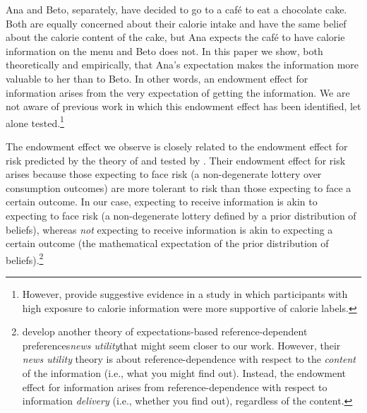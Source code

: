 
Ana and Beto, separately, have decided to go to a café to eat a chocolate cake. Both are equally concerned about their calorie intake and have the same belief about the calorie content of the cake, but Ana expects the café to have calorie information on the menu and Beto does not. In this paper we show, both theoretically and empirically, that Ana’s expectation makes the information more valuable to her than to Beto.  In other words, an endowment effect for information arises from the very expectation of getting the information. We are not aware of previous work in which this endowment effect has been identified, let alone tested.\footnote{However, \citet{cawleyImpactInformationDisclosure2020} provide suggestive evidence in a study in which participants with high exposure to calorie information were more supportive of calorie labels.}


The endowment effect we observe is closely related to the endowment effect for risk predicted by the theory of \citet{koszegiReferenceDependentRiskAttitudes2007} and tested by \citet{sprengerEndowmentEffectRisk2015}. Their endowment effect for risk arises because those expecting to face risk (a non-degenerate lottery over consumption outcomes) are more tolerant to risk than those expecting to face a certain outcome. In our case, expecting to receive information is akin to expecting to face risk (a non-degenerate lottery defined by a prior distribution of beliefs), whereas \emph{not} expecting to receive information is akin to expecting a certain outcome (the mathematical expectation of the prior distribution of beliefs).\footnote{\citet{koszegiReferenceDependentConsumptionPlans2009} develop another theory of expectations-based reference-dependent preferences\textemdash\emph{news utility}\textemdash that might seem closer to our work. However, their \emph{news utility} theory is about reference-dependence with respect to the \emph{content} of the information (i.e., what you might find out). Instead, the endowment effect for information arises from reference-dependence with respect to information \emph{delivery} (i.e., whether you find out), regardless of the content.}


